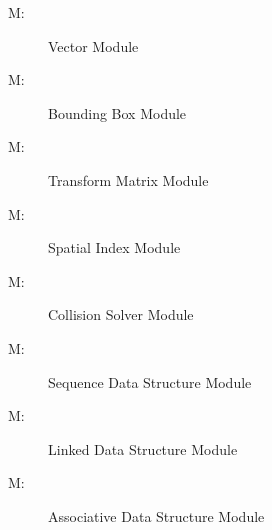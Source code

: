 \documentclass[12pt]{article}
\newcounter{modnum}
\newcommand{\mthemodnum}{M\themodnum}
\begin{document}
\begin{description}
\item[\mthemodnum\label{M:modvectorserv}:]Vector Module
\end{description}
\begin{description}
\item[\mthemodnum\label{M:modbbserv}:]Bounding Box Module
\end{description}
\begin{description}
\item[\mthemodnum\label{M:modtransserv}:]Transform Matrix Module
\end{description}
\begin{description}
\item[\mthemodnum\label{M:modspatialserv}:]Spatial Index Module
\end{description}
\begin{description}
\item[\mthemodnum\label{M:modcollserv}:]Collision Solver Module
\end{description}
\begin{description}
\item[\mthemodnum\label{M:modseqserv}:]Sequence Data Structure Module
\end{description}
\begin{description}
\item[\mthemodnum\label{M:modlinkedserv}:]Linked Data Structure Module
\end{description}
\begin{description}
\item[\mthemodnum\label{M:modassocserv}:]Associative Data Structure Module
\end{description}
\end{document}
